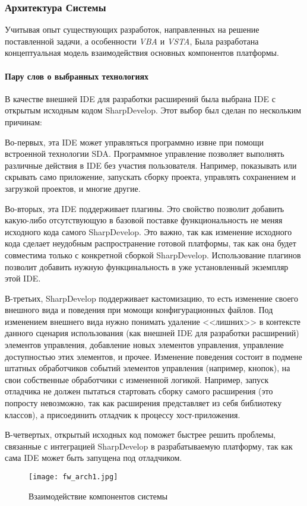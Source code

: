 \subsubsection{Архитектура Системы}

Учитывая опыт существующих разработок, направленных на решение поставленной задачи, а особенности {\it VBA} и {\it VSTA}, Была разработана концептуальная модель взаимодействия основных компонентов платформы.

\paragraph{Пару слов о выбранных технологиях}

В качестве внешней IDE для разработки расширений была выбрана IDE с открытым исходным кодом SharpDevelop. Этот выбор был сделан по нескольким причинам:

Во-первых, эта IDE может управляться программно извне при помощи встроенной технологии SDA. Программное управление позволяет выполнять различные действия в IDE без участия пользователя. Например, показывать или скрывать само приложение, запускать сборку проекта, управлять сохранением и загрузкой проектов, и многие другие. 

Во-вторых, эта IDE поддерживает плагины. Это свойство позволит добавить какую-либо отсутствующую в базовой поставке функциональность не меняя исходного кода самого SharpDevelop. Это важно, так как изменение исходного кода сделает неудобным распространение готовой платформы, так как она будет совместима только с конкретной сборкой SharpDevelop. Использование плагинов позволит добавить нужную функцинальность в уже установленный экземпляр этой IDE.

В-третьих, SharpDevelop поддерживает кастомизацию, то есть изменение своего внешного вида и поведения при момощи конфигурационных файлов. Под изменением внешнего вида нужно понимать удаление <<лишних>> в контексте данного сценария использования (как внешней IDE для разработки расширений) элементов управления, добавление новых элементов управления, управление доступностью этих элементов, и прочее. Изменение поведения состоит в подмене штатных обработчиков событий элементов управления (например, кнопок), на свои собственные обработчики с измененной логикой. Например, запуск отладчика не должен пытаться стартовать сборку самого расширения (это попросту невозможно, так как расширения представляет из себя библиотеку классов), а присоединить отладчик к процессу хост-приложения.

В-четвертых, открытый исходных код поможет быстрее решить проблемы, связанные с интеграцией SharpDevelop в разрабатываемую платформу, так как сама IDE может быть запущена под отладчиком.


\begin{figure}[!h]
    \centering
    \texttt{[image: fw\_arch1.jpg]}
    \caption{Взаимодействие компонентов системы}
    \label{fw_arch1}
\end{figure}
